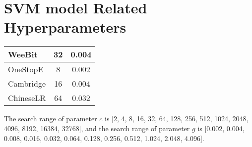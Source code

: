 \documentclass[11pt]{article}
\begin{document}
\section{SVM model Related Hyperparameters}
\begin{center}
\small
{}
\tabletail{\hline\hline}
\tablelasttail{\hline\hline}
\begin{supertabular}{p{3cm}|cc}
WeeBit          & 32    & 0.004 \\
\hline
OneStopE        & 8     & 0.002 \\
\hline
Cambridge       & 16    & 0.004 \\
\hline
ChineseLR       & 64    & 0.032 \\
\end{supertabular}
\end{center}
The search range of parameter $c$ is [2, 4, 8, 16, 32, 64, 128, 256, 512, 1024, 2048, 4096, 8192, 16384, 32768], and the search range of parameter $g$ is [0.002, 0.004, 0.008, 0.016, 0.032, 0.064, 0.128, 0.256, 0.512, 1.024, 2.048, 4.096].
\end{document}
